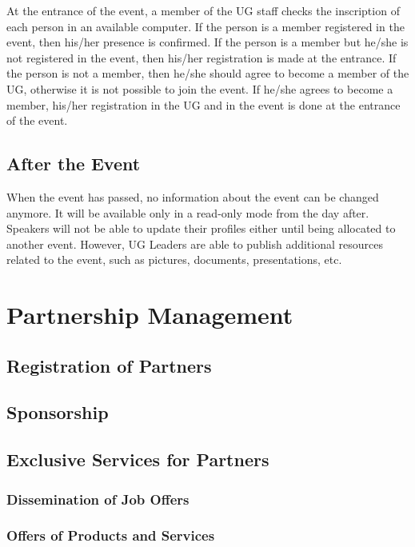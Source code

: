 \documentclass[envcountsame,envcountchap]{svmono}
\begin{document}
At the entrance of the event, a member of the UG staff checks the inscription of each person in an available computer. If the person is a member registered in the event, then his/her presence is confirmed. If the person is a member but he/she is not registered in the event, then his/her registration is made at the entrance. If the person is not a member, then he/she should agree to become a member of the UG, otherwise it is not possible to join the event. If he/she agrees to become a member, his/her registration in the UG and in the event is done at the entrance of the event.

\section{After the Event}

When the event has passed, no information about the event can be changed anymore. It will be available only in a read-only mode from the day after. Speakers will not be able to update their profiles either until being allocated to another event. However, UG Leaders are able to publish additional resources related to the event, such as pictures, documents, presentations, etc.

\chapter{Partnership Management}

\section{Registration of Partners}

\section{Sponsorship}

\section{Exclusive Services for Partners}

\subsection{Dissemination of Job Offers}

\subsection{Offers of Products and Services}
\end{document}
